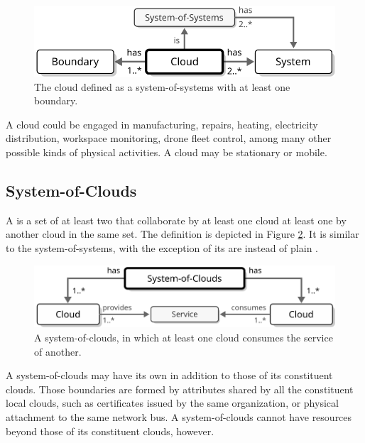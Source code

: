\begin{figure}[ht!]
  \centering
  \includegraphics[scale=0.9]{figures/cloud}
  \caption{
    The cloud defined as a system-of-systems with at least one boundary.
  }
  \label{fig:cloud}
\end{figure}

A cloud could be engaged in manufacturing, repairs, heating, electricity distribution, workspace monitoring, drone fleet control, among many other possible kinds of physical activities.
A cloud may be stationary or mobile.

\subsection{System-of-Clouds}
\label{sec:concepts:soc}

A  is a set of at least two  that collaborate by at least one cloud  at least one   by another cloud in the same set.
The definition is depicted in Figure \ref{fig:system-of-clouds}.
It is similar to the system-of-systems, with the exception of its  are  instead of plain .

\begin{figure}[ht!]
  \centering
  \includegraphics[scale=0.9]{figures/system-of-clouds}
  \caption{
    A system-of-clouds, in which at least one cloud consumes the service of another.
  }
  \label{fig:system-of-clouds}
\end{figure}

A system-of-clouds may have its own  in addition to those of its constituent clouds.
Those boundaries are formed by attributes shared by all the constituent local clouds, such as certificates issued by the same organization, or physical attachment to the same network bus.
A system-of-clouds cannot have resources beyond those of its constituent clouds, however.

